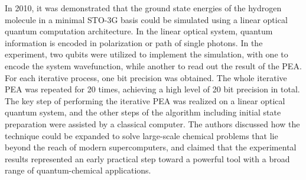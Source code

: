 \documentclass[8.5pt,twoside,twocolumn]{article}
\begin{document}
In 2010, it was demonstrated that the ground state energies of the hydrogen molecule in a minimal STO-3G basis could be simulated using a linear optical quantum
computation architecture.\cite{Optics_static}
In the linear optical system,
quantum information is encoded in polarization
or path of single photons.\cite{Optics_review_1,Optics_review_2}
In the experiment, two qubits were utilized to
implement the simulation, with one to encode the system wavefunction,
while another to read out the result of the PEA.
For each iterative process, one bit precision was obtained.
The whole iterative PEA was repeated for 20 times,
achieving a high level of 20 bit precision in total.
The key step of performing the iterative PEA was realized on a linear optical quantum system, and 
the other steps of the algorithm including initial state preparation were assisted by a classical computer.
The authors discussed how the technique could be expanded to solve large-scale chemical problems that lie beyond
the reach of modern supercomputers, and claimed that the experimental results represented an early practical step toward a powerful tool with a broad
range of quantum-chemical applications.
\end{document}
